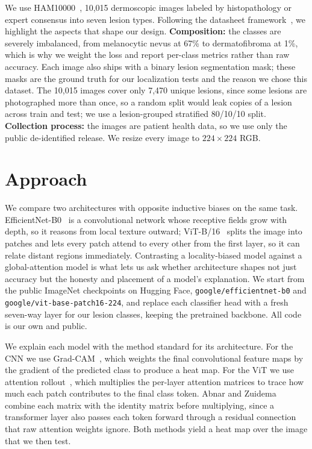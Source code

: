 \documentclass[10pt,twocolumn,letterpaper]{article}
\begin{document}
We use HAM10000~\cite{tschandl2018ham10000}, 10{,}015 dermoscopic images labeled
by histopathology or expert consensus into seven lesion types. Following the
datasheet framework~\cite{gebru2021datasheets}, we highlight the aspects that
shape our design. \textbf{Composition:} the classes are severely imbalanced,
from melanocytic nevus at 67\% to dermatofibroma at 1\%, which is why we weight
the loss and report per-class metrics rather than raw accuracy. Each image also
ships with a binary lesion segmentation mask; these masks are the ground truth
for our localization tests and the reason we chose this dataset. The 10{,}015
images cover only 7{,}470 unique lesions, since some lesions are photographed
more than once, so a random split would leak copies of a lesion across train and
test; we use a lesion-grouped stratified 80/10/10 split. \textbf{Collection
process:} the images are patient health data, so we use only the public
de-identified release. We resize every image to $224\times224$ RGB.

\section{Approach}
\label{sec:approach}

We compare two architectures with opposite inductive biases on the same task.
EfficientNet-B0~\cite{tan2019efficientnet} is a convolutional network whose
receptive fields grow with depth, so it reasons from local texture outward;
ViT-B/16~\cite{dosovitskiy2021vit} splits the image into patches and lets every
patch attend to every other from the first layer, so it can relate distant
regions immediately. Contrasting a locality-biased model against a
global-attention model is what lets us ask whether architecture shapes not just
accuracy but the honesty and placement of a model's explanation. We start from
the public ImageNet checkpoints on Hugging Face, \texttt{google/efficientnet-b0}
and \texttt{google/vit-base-patch16-224}, and replace each classifier head with a
fresh seven-way layer for our lesion classes, keeping the pretrained backbone.
All code is our own and public.\footnotemark

We explain each model with the method standard for its architecture. For the CNN
we use Grad-CAM~\cite{selvaraju2017gradcam}, which weights the final
convolutional feature maps by the gradient of the predicted class to produce a
heat map. For the ViT we use attention rollout~\cite{abnar2020attention}, which
multiplies the per-layer attention matrices to trace how much each patch
contributes to the final class token. Abnar and Zuidema~\cite{abnar2020attention}
combine each matrix with the identity matrix before multiplying, since a
transformer layer also passes each token forward through a residual connection
that raw attention weights ignore. Both methods yield a heat map over the image
that we then test.
\end{document}
